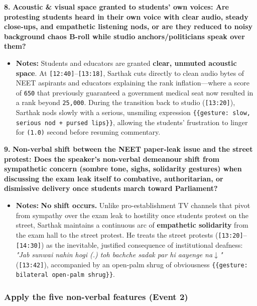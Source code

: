 \documentclass[10pt,a4paper]{article}
\begin{document}
\noindent\textbf{8.} \textbf{Acoustic \& visual space granted to students' own voices: Are protesting students heard in their own voice with clear audio, steady close-ups, and empathetic listening nods, or are they reduced to noisy background chaos B-roll while studio anchors/politicians speak over them?}\par\smallskip
\begin{itemize}
  \item \textbf{Notes:}
Students and educators are granted \textbf{clear, unmuted acoustic space}. At \texttt{[12:40]}--\texttt{[13:18]}, Sarthak cuts directly to clean audio bytes of NEET aspirants and educators explaining the rank inflation---where a score of \texttt{650} that previously guaranteed a government medical seat now resulted in a rank beyond \texttt{25,000}. During the transition back to studio (\texttt{[13:20]}), Sarthak nods slowly with a serious, unsmiling expression \texttt{\{\{gesture: slow, serious nod + pursed lips\}\}}, allowing the students' frustration to linger for \texttt{(1.0)} second before resuming commentary.\par\smallskip
\end{itemize}

\noindent\textbf{9.} \textbf{Non-verbal shift between the NEET paper-leak issue and the street protest: Does the speaker's non-verbal demeanour shift from sympathetic concern (sombre tone, sighs, solidarity gestures) when discussing the exam leak itself to combative, authoritarian, or dismissive delivery once students march toward Parliament?}\par\smallskip
\begin{itemize}
  \item \textbf{Notes:}
\textbf{No shift occurs.} Unlike pro-establishment TV channels that pivot from sympathy over the exam leak to hostility once students protest on the street, Sarthak maintains a continuous arc of \textbf{empathetic solidarity} from the exam hall to the street protest. He treats the street protests (\texttt{[13:20]}--\texttt{[14:30]}) as the inevitable, justified consequence of institutional deafness: \textit{"Jab sunwai nahin hogi (.) toh bachche sadak par hi aayenge na$\downarrow$"} (\texttt{[13:42]}), accompanied by an open-palm shrug of obviousness \texttt{\{\{gesture: bilateral open-palm shrug\}\}}.\par\smallskip
\end{itemize}

\subsubsection*{Apply the five non-verbal features (Event 2)}
\end{document}
